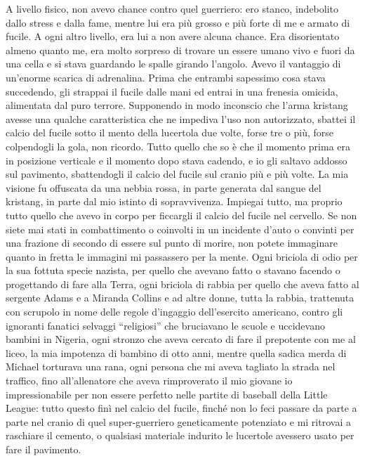 A livello fisico, non avevo chance contro quel guerriero: ero stanco,
indebolito dallo stress e dalla fame, mentre lui era più grosso e più
forte di me e armato di fucile. A ogni altro livello, era lui a non
avere alcuna chance. Era disorientato almeno quanto me, era molto
sorpreso di trovare un essere umano vivo e fuori da una cella e si stava
guardando le spalle girando l'angolo. Avevo il vantaggio di un'enorme
scarica di adrenalina. Prima che entrambi sapessimo cosa stava
succedendo, gli strappai il fucile dalle mani ed entrai in una frenesia
omicida, alimentata dal puro terrore. Supponendo in modo inconscio che
l'arma kristang avesse una qualche caratteristica che ne impediva l'uso
non autorizzato, sbattei il calcio del fucile sotto il mento della
lucertola due volte, forse tre o più, forse colpendogli la gola, non
ricordo. Tutto quello che so è che il momento prima era in posizione
verticale e il momento dopo stava cadendo, e io gli saltavo addosso sul
pavimento, sbattendogli il calcio del fucile sul cranio più e più volte.
La mia visione fu offuscata da una nebbia rossa, in parte generata dal
sangue del kristang, in parte dal mio istinto di sopravvivenza. Impiegai
tutto, ma proprio tutto quello che avevo in corpo per ficcargli il
calcio del fucile nel cervello. Se non siete mai stati in combattimento
o coinvolti in un incidente d'auto o convinti per una frazione di
secondo di essere sul punto di morire, non potete immaginare quanto in
fretta le immagini mi passassero per la mente. Ogni briciola di odio per
la sua fottuta specie nazista, per quello che avevano fatto o stavano
facendo o progettando di fare alla Terra, ogni briciola di rabbia per
quello che aveva fatto al sergente Adams e a Miranda Collins e ad altre
donne, tutta la rabbia, trattenuta con scrupolo in nome delle regole
d'ingaggio dell'esercito americano, contro gli ignoranti fanatici
selvaggi ``religiosi'' che bruciavano le scuole e uccidevano bambini in
Nigeria, ogni stronzo che aveva cercato di fare il prepotente con me al
liceo, la mia impotenza di bambino di otto anni, mentre quella sadica
merda di Michael torturava una rana, ogni persona che mi aveva tagliato
la strada nel traffico, fino all'allenatore che aveva rimproverato il
mio giovane io impressionabile per non essere perfetto nelle partite di
baseball della Little League: tutto questo finì nel calcio del fucile,
finché non lo feci passare da parte a parte nel cranio di quel
super-guerriero geneticamente potenziato e mi ritrovai a raschiare il
cemento, o qualsiasi materiale indurito le lucertole avessero usato per
fare il pavimento.

